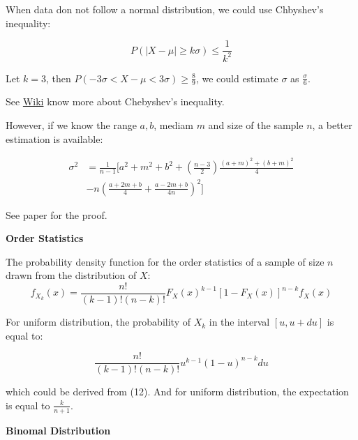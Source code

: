 \documentclass{article}
\begin{document}
When data don not follow a normal distribution, we could use Chbyshev's inequality:

\begin{equation}
P(|X-\mu|\geq k\sigma) \leq \frac{1}{k^2}
\end{equation}

Let \(k=3\), then \(P(-3\sigma < X - \mu < 3\sigma)\geq \frac{8}{9}\), we could estimate \(\sigma\) as
\(\frac{\sigma}{6}\).

See \href{https://en.wikipedia.org/wiki/Chebyshev's_inequality}{Wiki} know more about Chebyshev's inequality.

However, if we know the range \(a, b\), mediam \(m\) and size of the sample \(n\), a better estimation is available:

\begin{equation}
\begin{split}
\sigma^2 &= \frac{1}{n-1}[a^2+m^2+b^2+(\frac{n-3}{2})\frac{(a+m)^2+(b+m)^2}{4}\\
&-n(\frac{a+2m+b}{4}+\frac{a-2m+b}{4n})^2]
\end{split}
\end{equation}

See paper for the proof.

\vspace{3mm}

\textbf{Order Statistics}

The probability density function for the order statistics of a sample of size \(n\) drawn from the distribution
of \(X\):
\begin{equation}
f_{X_{k}}(x)=\frac{n!}{(k-1)!(n-k)!}F_X(x)^{k-1}[1-F_X(x)]^{n-k}f_X(x)
\end{equation}

For uniform distribution, the probability of \(X_k\) in the interval \([u, u+du]\) is equal to:

\begin{equation}
\frac{n!}{(k-1)!(n-k)!}u^{k-1}(1-u)^{n-k}du
\end{equation}

which could be derived from (12). And for uniform distribution, the expectation is equal
to \(\frac{k}{n+1}\).

\vspace{3mm}
\textbf{Binomal Distribution}
\end{document}
